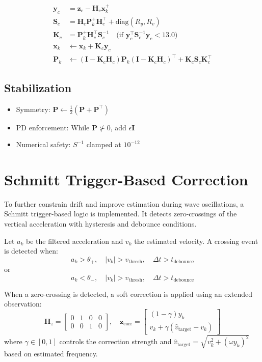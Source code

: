 \documentclass[11pt,letterpaper]{article}
\begin{document}
\begin{align}
\bm{y}_c &= \bm{z}_c - \bm{H}_c\bm{x}_k^+ \\
\bm{S}_c &= \bm{H}_c\bm{P}_k^+\bm{H}_c^\top + \mathrm{diag}(R_y, R_v) \\
\bm{K}_c &= \bm{P}_k^+\bm{H}_c^\top \bm{S}_c^{-1} \quad \text{(if $\bm{y}_c^\top\bm{S}_c^{-1}\bm{y}_c < 13.0$)} \\
\bm{x}_k &\leftarrow \bm{x}_k + \bm{K}_c\bm{y}_c \\
\bm{P}_k &\leftarrow (\bm{I}-\bm{K}_c\bm{H}_c)\bm{P}_k(\bm{I}-\bm{K}_c\bm{H}_c)^\top + \bm{K}_c\bm{S}_c\bm{K}_c^\top
\end{align}

\subsection{Stabilization}
\begin{itemize}
\item Symmetry: $\bm{P} \leftarrow \frac{1}{2}(\bm{P}+\bm{P}^\top)$
\item PD enforcement: While $\bm{P} \not\succ 0$, add $\epsilon\bm{I}$
\item Numerical safety: $S^{-1}$ clamped at $10^{-12}$
\end{itemize}


\section{Schmitt Trigger-Based Correction}
To further constrain drift and improve estimation during wave oscillations, a Schmitt trigger-based logic is implemented. It detects zero-crossings of the vertical acceleration with hysteresis and debounce conditions.

Let \( a_k \) be the filtered acceleration and \( v_k \) the estimated velocity. A crossing event is detected when:
\[
a_k > \theta_{+}, \quad |v_k| > v_\text{thresh}, \quad \Delta t > t_\text{debounce}
\]
or
\[
a_k < \theta_{-}, \quad |v_k| > v_\text{thresh}, \quad \Delta t > t_\text{debounce}
\]

When a zero-crossing is detected, a soft correction is applied using an extended observation:
\[
\mathbf{H}_z =
\begin{bmatrix}
0 & 1 & 0 & 0 \\
0 & 0 & 1 & 0
\end{bmatrix}, \quad
\mathbf{z}_\text{corr} =
\begin{bmatrix}
(1 - \gamma)y_k \\
v_k + \gamma(\hat{v}_\text{target} - v_k)
\end{bmatrix}
\]
where \( \gamma \in [0,1] \) controls the correction strength and \( \hat{v}_\text{target} = \sqrt{v_k^2 + (\omega y_k)^2} \) based on estimated frequency.
\end{document}
